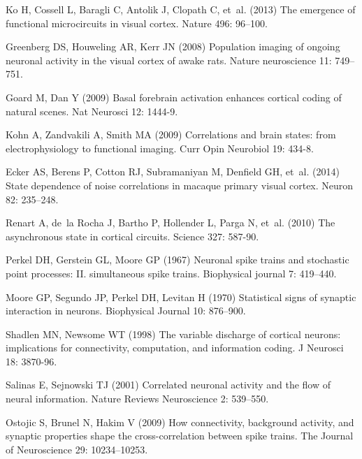 \begin{thebibliography}{100}
Ko H, Cossell L, Baragli C, Antolik J, Clopath C, et~al. (2013) The emergence
  of functional microcircuits in visual cortex.
\newblock Nature 496: 96--100.

Greenberg DS, Houweling AR, Kerr JN (2008) Population imaging of ongoing
  neuronal activity in the visual cortex of awake rats.
\newblock Nature neuroscience 11: 749--751.

Goard M, Dan Y (2009) Basal forebrain activation enhances cortical coding of
  natural scenes.
\newblock Nat Neurosci 12: 1444-9.

Kohn A, Zandvakili A, Smith MA (2009) Correlations and brain states: from
  electrophysiology to functional imaging.
\newblock Curr Opin Neurobiol 19: 434-8.

Ecker AS, Berens P, Cotton RJ, Subramaniyan M, Denfield GH, et~al. (2014) State
  dependence of noise correlations in macaque primary visual cortex.
\newblock Neuron 82: 235--248.

Renart A, de~la Rocha J, Bartho P, Hollender L, Parga N, et~al. (2010) The
  asynchronous state in cortical circuits.
\newblock Science 327: 587-90.

Perkel DH, Gerstein GL, Moore GP (1967) Neuronal spike trains and stochastic
  point processes: {II}. simultaneous spike trains.
\newblock Biophysical journal 7: 419--440.

Moore GP, Segundo JP, Perkel DH, Levitan H (1970) Statistical signs of synaptic
  interaction in neurons.
\newblock Biophysical Journal 10: 876--900.

Shadlen MN, Newsome WT (1998) The variable discharge of cortical neurons:
  implications for connectivity, computation, and information coding.
\newblock J Neurosci 18: 3870-96.

Salinas E, Sejnowski TJ (2001) Correlated neuronal activity and the flow of
  neural information.
\newblock Nature Reviews Neuroscience 2: 539--550.

Ostojic S, Brunel N, Hakim V (2009) How connectivity, background activity, and
  synaptic properties shape the cross-correlation between spike trains.
\newblock The Journal of Neuroscience 29: 10234--10253.


\end{thebibliography}
